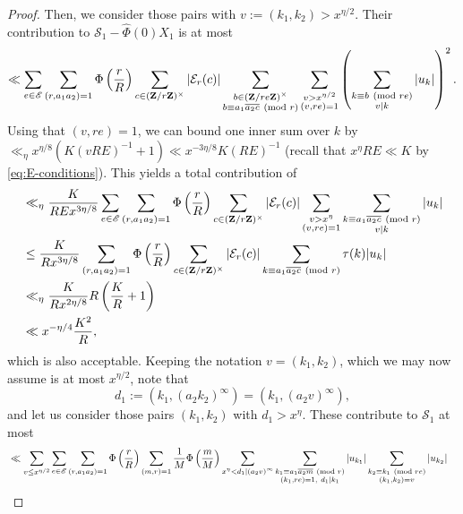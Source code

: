 \documentclass[reqno,11pt]{amsart}
\theoremstyle{definition}
\theoremstyle{remark}
\numberwithin{equation}{section}
\newcommand{\Z}{\mathbf{Z}}
\newcommand{\msE}{\mathscr{E}}
\newcommand{\mE}{\mathcal{E}}
\newcommand{\mS}{\mathcal{S}}
\renewcommand{\bar}{\overline}
\renewcommand{\hat}{\widehat}
\renewcommand{\pmod}[1]{\ (\textnormal{mod } #1)}
\begin{document}
\begin{proof}
Then, we consider those pairs with $v := (k_1, k_2) > x^{\eta/2}$. Their contribution to $\mS_1 - \hat{\Phi}(0)X_1$ is at most
\[
    \ll 
    \sum_{e \in \msE} \sum_{(r,a_1a_2)=1} \Phi\left(\frac{r}{R}\right) \sum_{c \in (\Z/r\Z)^\times} |\mE_r(c)|
    \sum_{\substack{b \in (\Z/re\Z)^\times \\ b \equiv a_1\bar{a_2c} \pmod{r}}} 
    \sum_{\substack{v > x^{\eta/2} \\ (v,re)=1}}
    \left(\sum_{\substack{k \equiv b \pmod{re} \\ v \mid k}} |u_k| \right)^2.
\]
Using that $(v, re) = 1$, we can bound one inner sum over $k$ by $\ll_\eta x^{\eta/8}(K(vRE)^{-1} + 1) \ll x^{-3\eta/8}K(RE)^{-1}$ (recall that $x^{\eta} RE \ll K$ by \cref{eq:E-conditions}). This yields a total contribution of
\[
\begin{aligned}
    &\ll_\eta
    \frac{K}{REx^{3\eta/8}}
    \sum_{e \in \msE} \sum_{(r,a_1a_2)=1} \Phi\left(\frac{r}{R}\right) \sum_{c \in (\Z/r\Z)^\times} |\mE_r(c)|
    \sum_{\substack{v > x^\eta \\ (v,re)=1}}
    \sum_{\substack{k \equiv a_1\bar{a_2c} \pmod{r} \\ v \mid k}} |u_k| 
    \\
    &\le
    \frac{K}{Rx^{3\eta/8}}
    \sum_{(r,a_1a_2)=1} \Phi\left(\frac{r}{R}\right) \sum_{c \in (\Z/r\Z)^\times} |\mE_r(c)|
    \sum_{\substack{k \equiv a_1\bar{a_2c} \pmod{r}}} 
    \tau(k) |u_k| 
    \\
    &\ll_\eta
    \frac{K}{Rx^{2\eta/8}} R
    \left(\frac{K}{R} + 1\right)
    \\
    &\ll x^{-\eta/4} \frac{K^2}{R},
\end{aligned}
\]
which is also acceptable. Keeping the notation $v = (k_1, k_2)$, which we may now assume is at most $x^{\eta/2}$, note that %
\[
    d_1 := (k_1, (a_2k_2)^\infty) = (k_1, (a_2 v)^\infty),
\]
and let us consider those pairs $(k_1, k_2)$ with $d_1 > x^\eta$. These contribute to $\mS_1$ at most
\[
\begin{aligned}
    &\ll
    \sum_{v \le x^{\eta/2}}
    \sum_{e \in \msE} \sum_{(r,a_1a_2)=1} \Phi\left(\frac{r}{R}\right) \sum_{(m, r) = 1} \frac{1}{M} \Phi\left(\frac{m}{M}\right) 
    \sum_{\substack{x^\eta < d_1 \mid (a_2v)^\infty}}
    \sum_{\substack{k_1 \equiv a_1 \bar{a_2m} \pmod{r} \\ (k_1, re) = 1,\ d_1 \mid k_1}} |u_{k_1}| \sum_{\substack{k_2 \equiv k_1 \pmod{re} \\ (k_1, k_2) = v}}  |u_{k_2}|

\end{aligned}\]
\end{proof}
\end{document}
